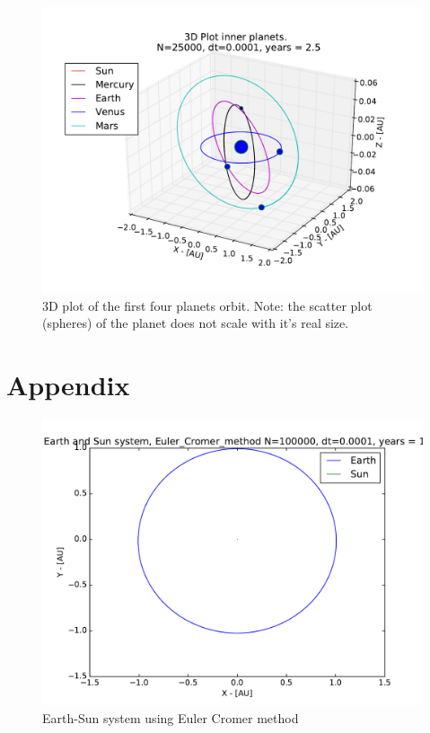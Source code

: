 \documentclass[12pt]{article}
\begin{document}
\begin{figure}[!h]
\centering
\includegraphics[width=\linewidth]{Plots/First_planets_3D_plot.pdf}
\caption{3D plot of the first four planets orbit. Note: the scatter plot (spheres) of the planet does not scale with it's real size.}
\label{fig:First4_planets_3D}
\end{figure}
\FloatBarrier

\section*{Appendix}
\begin{figure}[!h]
\centering
\includegraphics[width=\linewidth]{Plots/Earth_Sun_Euler_Cromer_method.pdf}
\caption{Earth-Sun system using Euler Cromer method}
\label{fig:Appendix_EulerCromer}
\end{figure}
\end{document}
